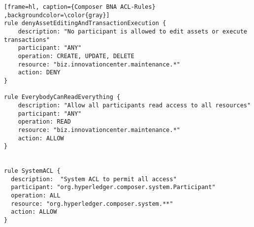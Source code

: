 \begin{appendices}
\begin{lstlisting}[frame=hl, caption={Composer BNA ACL-Rules} ,backgroundcolor=\color{gray}]
rule denyAssetEditingAndTransactionExecution {
    description: "No participant is allowed to edit assets or execute transactions"
    participant: "ANY"
    operation: CREATE, UPDATE, DELETE
    resource: "biz.innovationcenter.maintenance.*"
    action: DENY
}

rule EverybodyCanReadEverything {
    description: "Allow all participants read access to all resources"
    participant: "ANY"
    operation: READ
    resource: "biz.innovationcenter.maintenance.*"
    action: ALLOW
}


rule SystemACL {
  description:  "System ACL to permit all access"
  participant: "org.hyperledger.composer.system.Participant"
  operation: ALL
  resource: "org.hyperledger.composer.system.**"
  action: ALLOW
}
\end{lstlisting}


\end{appendices}

